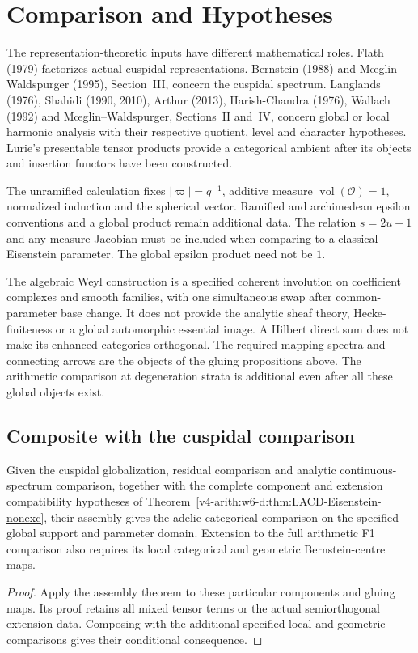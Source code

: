 \section{Comparison and Hypotheses}
\label{v4-arith:w6-d:source-comparison}
The representation-theoretic inputs have different mathematical roles.
Flath (1979) factorizes actual cuspidal representations. Bernstein
(1988) and M\oe glin--Waldspurger (1995), Section~III, concern the
cuspidal spectrum. Langlands (1976), Shahidi (1990, 2010), Arthur
(2013), Harish-Chandra (1976), Wallach (1992) and
M\oe glin--Waldspurger, Sections~II and~IV, concern global or local
harmonic analysis with their respective quotient, level and character
hypotheses. Lurie's presentable tensor products provide a categorical
ambient after its objects and insertion functors have been constructed.

The unramified calculation fixes $|\varpi|=q^{-1}$, additive measure
$\operatorname{vol}(\mathcal O)=1$, normalized induction and the
spherical vector. Ramified and archimedean epsilon conventions and a
global product remain additional data. The relation $s=2u-1$ and
any measure Jacobian must be included when comparing to a classical
Eisenstein parameter. The global epsilon product need not be $1$.

The algebraic Weyl construction is a specified coherent involution on
coefficient complexes and smooth families, with one simultaneous swap
after common-parameter base change. It does not provide the analytic
sheaf theory, Hecke-finiteness or a global automorphic essential image.
A Hilbert direct sum does not make its enhanced categories orthogonal.
The required mapping spectra and connecting arrows are the objects of
the gluing propositions above. The arithmetic comparison at degeneration
strata is additional even after all these global objects exist.

\subsection{Composite with the cuspidal comparison}
\begin{theorem}
\label{v4-arith:w6-d:thm:composite-LACD}
Given the cuspidal globalization, residual comparison and analytic
continuous-spectrum comparison, together with the complete component
and extension compatibility hypotheses of
Theorem~\ref{v4-arith:w6-d:thm:LACD-Eisenstein-nonexc}, their
assembly gives the adelic categorical comparison on the specified
global support and parameter domain. Extension to the full arithmetic
F1 comparison also requires its local categorical and geometric
Bernstein-centre maps.
\end{theorem}
\begin{proof}
Apply the assembly theorem to these particular components and gluing
maps. Its proof retains all mixed tensor terms or the actual
semiorthogonal extension data. Composing with the additional specified
local and geometric comparisons gives their conditional consequence.
\end{proof}

